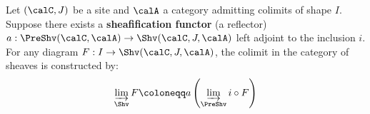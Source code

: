 \begin{definition} \label{definition:colimit_in_a_sheaf_category}

    Let $(\calC, J)$ be a site and $\calA$ a category admitting colimits of shape $I$. Suppose there exists a \textbf{sheafification functor} (a reflector) $a: \PreShv(\calC, \calA) \to \Shv(\calC, J, \calA)$ left adjoint to the inclusion $i$. For any diagram $F: I \to \Shv(\calC, J, \calA)$, the colimit in the category of sheaves is constructed by:
    \[ \varinjlim_{\Shv} F \coloneqq a \left( \varinjlim_{\PreShv} i \circ F \right) \]
\end{definition}